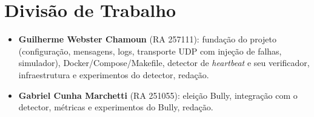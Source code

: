\documentclass[conference]{IEEEtran}
\newif\ifrascunho
\DeclareRobustCommand{\todo}[1]{\ifrascunho{\color{red}\textbf{[#1]}}\fi}
\begin{document}
\todo{Fontes de código reutilizado e modificações}

\section*{Divisão de Trabalho}

\begin{itemize}
\item \textbf{Guilherme Webster Chamoun} (RA 257111): fundação do projeto (configuração, mensagens, logs, transporte UDP com injeção de falhas, simulador), Docker/Compose/Makefile, detector de \textit{heartbeat} e seu verificador, infraestrutura e experimentos do detector, redação.
  \item \textbf{Gabriel Cunha Marchetti} (RA 251055): eleição Bully, integração com o detector, métricas e experimentos do Bully, redação.
\end{itemize}

\todo{Adicionar referências bibliográficas e suas citações; referencias.bib não foi fornecido.}
\end{document}

